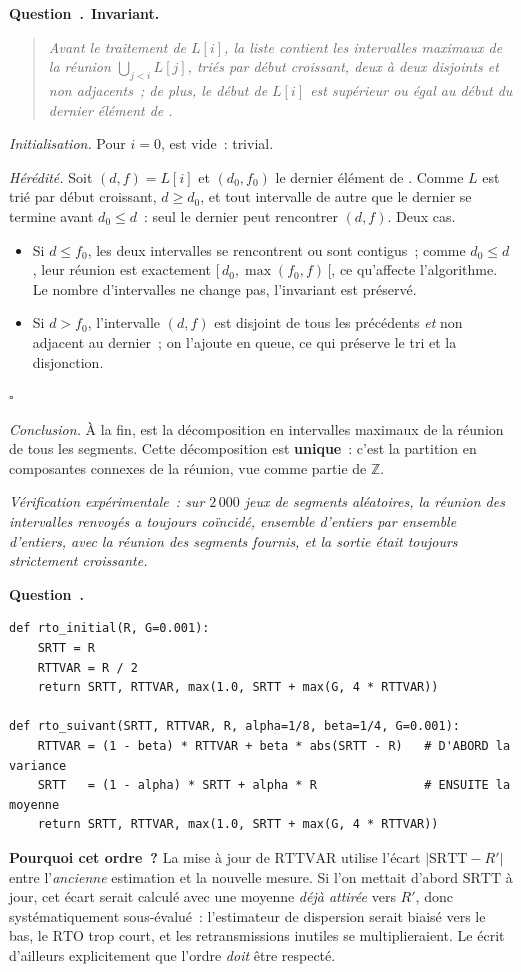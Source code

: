 \documentclass[11pt,a4paper]{article}
\renewcommand{\Q}{\medskip\par\stepcounter{qcnt}\noindent\textbf{\color{cnc}Question~\theqcnt.}~}
\begin{document}
\Q \textbf{Invariant.}
\begin{quote}\itshape
Avant le traitement de $L[i]$, la liste  contient les intervalles maximaux de la
réunion $\bigcup_{j<i}L[j]$, triés par début croissant, deux à deux disjoints et non
adjacents~; de plus, le début de $L[i]$ est supérieur ou égal au début du dernier élément de
.
\end{quote}
\emph{Initialisation.} Pour $i=0$,  est vide~: trivial.

\emph{Hérédité.} Soit $(d,f)=L[i]$ et $(d_0,f_0)$ le dernier élément de . Comme $L$
est trié par début croissant, $d\ge d_0$, et tout intervalle de  autre que le
dernier se termine avant $d_0\le d$~: seul le dernier peut rencontrer $(d,f)$. Deux cas.
\begin{itemize}[leftmargin=1.4em,itemsep=1pt]
\item Si $d\le f_0$, les deux intervalles se rencontrent ou sont contigus~; comme
$d_0\le d$, leur réunion est exactement $[\,d_0,\max(f_0,f)\,[$, ce qu'affecte l'algorithme.
Le nombre d'intervalles ne change pas, l'invariant est préservé.
\item Si $d>f_0$, l'intervalle $(d,f)$ est disjoint de tous les précédents \emph{et} non
adjacent au dernier~; on l'ajoute en queue, ce qui préserve le tri et la disjonction.
\end{itemize}
\hfill$\square$

\emph{Conclusion.} À la fin,  est la décomposition en intervalles maximaux de la
réunion de tous les segments. Cette décomposition est \textbf{unique}~: c'est la partition
en composantes connexes de la réunion, vue comme partie de $\mathbb{Z}$.

\emph{Vérification expérimentale~: sur $2\,000$ jeux de segments aléatoires, la réunion des
intervalles renvoyés a toujours coïncidé, ensemble d'entiers par ensemble d'entiers, avec la
réunion des segments fournis, et la sortie était toujours strictement croissante.}

\Q
\begin{lstlisting}
def rto_initial(R, G=0.001):
    SRTT = R
    RTTVAR = R / 2
    return SRTT, RTTVAR, max(1.0, SRTT + max(G, 4 * RTTVAR))

def rto_suivant(SRTT, RTTVAR, R, alpha=1/8, beta=1/4, G=0.001):
    RTTVAR = (1 - beta) * RTTVAR + beta * abs(SRTT - R)   # D'ABORD la variance
    SRTT   = (1 - alpha) * SRTT + alpha * R               # ENSUITE la moyenne
    return SRTT, RTTVAR, max(1.0, SRTT + max(G, 4 * RTTVAR))
\end{lstlisting}
\textbf{Pourquoi cet ordre~?} La mise à jour de $\mathrm{RTTVAR}$ utilise l'écart
$|\mathrm{SRTT}-R'|$ entre l'\emph{ancienne} estimation et la nouvelle mesure. Si l'on
mettait d'abord $\mathrm{SRTT}$ à jour, cet écart serait calculé avec une moyenne \emph{déjà
attirée} vers $R'$, donc systématiquement sous-évalué~: l'estimateur de dispersion serait
biaisé vers le bas, le $\mathrm{RTO}$ trop court, et les retransmissions inutiles se
multiplieraient. Le  écrit d'ailleurs explicitement que l'ordre \emph{doit} être
respecté.
\end{document}
